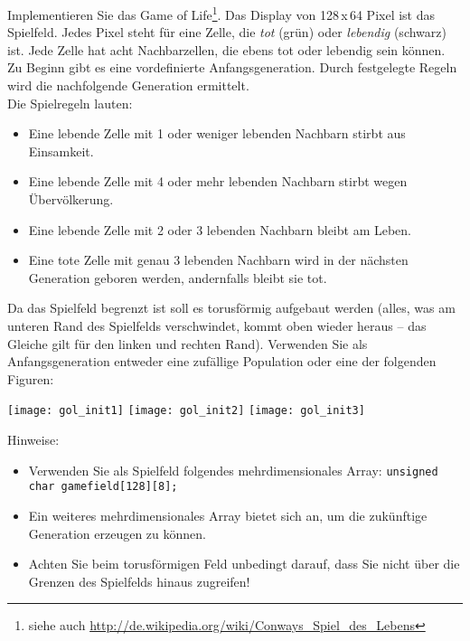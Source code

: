 \documentclass[
  accentcolor=tud1c,	%
  colorbacktitle,		%
  inverttitle,			%
  german,				%
  twoside
]{tudexercise}
\begin{document}
Implementieren Sie das \glqq{}Game of Life\grqq{}\footnote{siehe auch \url{http://de.wikipedia.org/wiki/Conways_Spiel_des_Lebens}}. Das Display von 128\,x\,64 Pixel ist das Spielfeld. Jedes Pixel steht für eine Zelle, die \textit{tot} (grün) oder \textit{lebendig} (schwarz) ist. Jede Zelle hat acht Nachbarzellen, die ebens tot oder lebendig sein können. Zu Beginn gibt es eine vordefinierte Anfangsgeneration. Durch festgelegte Regeln wird die nachfolgende Generation ermittelt.\\
Die Spielregeln lauten:
\begin{itemize}
\item Eine lebende Zelle mit 1 oder weniger lebenden Nachbarn stirbt aus Einsamkeit.
\item Eine lebende Zelle mit 4 oder mehr lebenden Nachbarn stirbt wegen Übervölkerung.
\item Eine lebende Zelle mit 2 oder 3 lebenden Nachbarn bleibt am Leben.
\item Eine tote Zelle mit genau 3 lebenden Nachbarn wird in der nächsten Generation geboren werden, andernfalls bleibt sie tot.
\end{itemize}
Da das Spielfeld begrenzt ist soll es torusförmig aufgebaut werden (alles, was am unteren Rand des Spielfelds verschwindet, kommt oben wieder heraus -- das Gleiche gilt für den linken und rechten Rand). Verwenden Sie als Anfangsgeneration entweder eine zufällige Population oder eine der folgenden Figuren:
\begin{center}
\texttt{[image: gol\_init1]}
\hspace{5mm}
\texttt{[image: gol\_init2]}
\hspace{5mm}
\texttt{[image: gol\_init3]}
\end{center}
Hinweise:
\begin{itemize}
\item Verwenden Sie als Spielfeld folgendes mehrdimensionales Array:
\texttt{unsigned char gamefield[128][8];}
\item Ein weiteres mehrdimensionales Array bietet sich an, um die zukünftige Generation erzeugen zu können.
\item Achten Sie beim torusförmigen Feld unbedingt darauf, dass Sie nicht über die Grenzen des Spielfelds hinaus zugreifen!
\end{itemize}
\end{document}
